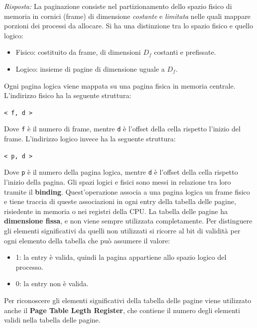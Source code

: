 \documentclass{article}
\newenvironment{solution}
    {\textit{Risposta:}}
    {}
\begin{document}
\begin{solution}
La paginazione consiste nel partizionamento dello spazio fisico di memoria in cornici (frame) di dimensione \textit{costante} e \textit{limitata} nelle quali mappare porzioni dei processi da allocare. Si ha una distinzione tra lo spazio fisico e quello logico: 
\begin{itemize}
    \item Fisico: costituito da frame, di dimensioni $D_f$ costanti e prefissate.
    \item Logico: insieme di pagine di dimensione uguale a $D_f$. 
\end{itemize}
Ogni pagina logica viene mappata su una pagina fisica in memoria centrale.
\newline
L’indirizzo fisico ha la seguente struttura:
\begin{center}
\texttt{< f, d >}
\end{center}
Dove \texttt{f} è il numero di frame, mentre \texttt{d} è l’offset della cella rispetto l’inizio del frame.
\newline
\newline
L’indirizzo logico invece ha la seguente struttura:
\begin{center}
\texttt{< p, d >}
\end{center}
Dove \texttt{p} è il numero della pagina logica, mentre \texttt{d} è l’offset della cella rispetto l’inizio della pagina.
Gli spazi logici e fisici sono messi in relazione tra loro tramite il \textbf{binding}.
\newline
Quest’operazione associa a una pagina logica un frame fisico e tiene traccia di queste associazioni in ogni entry della tabella delle pagine, risiedente in memoria o nei registri della CPU.
\newline
La tabella delle pagine ha \textbf{dimensione fissa}, e non viene sempre utilizzata completamente.
\newline
Per distinguere gli elementi significativi da quelli non utilizzati si ricorre al bit di validità per ogni elemento della tabella che può assumere il valore:
\begin{itemize}
    \item 1: la entry è valida, quindi la pagina appartiene allo spazio logico del processo.
    \item 0: la entry non è valida.
\end{itemize}
Per riconoscere gli elementi significativi della tabella delle pagine viene utilizzato anche il \textbf{Page Table Legth Register}, che contiene il numero degli elementi validi nella tabella delle pagine.\newline

\end{solution}
\end{document}

